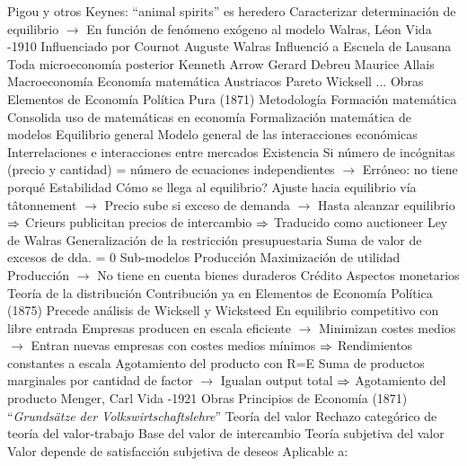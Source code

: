 \documentclass{nuevotema}
\begin{document}
\begin{esquemal}
				\4[] Pigou y otros
				\4[] Keynes: ``animal spirits'' es heredero
				\4[$\then$] Caracterizar determinación de equilibrio
				\4[] $\to$ En función de fenómeno exógeno al modelo
		\2 Walras, Léon
			\3 Vida
				-1910
			\3 Influenciado por
				\4 Cournot
				\4 Auguste Walras
			\3 Influenció a
				\4 Escuela de Lausana
				\4 Toda microeconomía posterior
				\4[] Kenneth Arrow
				\4[] Gerard Debreu
				\4[] Maurice Allais
				\4 Macroeconomía
				\4 Economía matemática
				\4 Austriacos
				\4 Pareto
				\4 Wicksell
				\4 ...
			\3 Obras
				\4 Elementos de Economía Política Pura (1871)
			\3 Metodología
				\4 Formación matemática
				\4 Consolida uso de matemáticas en economía
				\4 Formalización matemática de modelos
			\3 Equilibrio general
				\4 Modelo general de las interacciones económicas
				\4[] Interrelaciones e interacciones entre mercados
				\4 Existencia
				\4[] Si número de incógnitas (precio y cantidad)
				\4[] = número de ecuaciones independientes
				\4[] $\to$ Erróneo: no tiene porqué
				\4 Estabilidad
				\4[] Cómo se llega al equilibrio?
				\4[] Ajuste hacia equilibrio vía tâtonnement
				\4[] $\to$ Precio sube si exceso de demanda
				\4[] $\to$ Hasta alcanzar equilibrio
				\4[] $\then$ Crieurs publicitan precios de intercambio
				\4[] $\then$ Traducido como auctioneer
				\4 Ley de Walras
				\4[] Generalización de la restricción presupuestaria
				\4[] Suma de valor de excesos de dda. = 0
				\4 Sub-modelos
				\4[] Producción
				\4[] Maximización de utilidad
				\4[] Producción
				\4[] $\to$ No tiene en cuenta bienes duraderos
				\4[] Crédito
				\4[] Aspectos monetarios
			\3 Teoría de la distribución
				\4 Contribución ya en Elementos de Economía Política  (1875)
				\4 Precede análisis de Wicksell y Wicksteed
				\4 En equilibrio competitivo con libre entrada
				\4[] Empresas producen en escala eficiente
				\4[] $\to$ Minimizan costes medios
				\4[] $\to$ Entran nuevas empresas con costes medios mínimos
				\4[] $\then$ Rendimientos constantes a escala
				\4 Agotamiento del producto con R=E
				\4[] Suma de productos marginales por cantidad de factor
				\4[] $\to$ Igualan output total
				\4[] $\then$ Agotamiento del producto
		\2 Menger, Carl
			\3 Vida
				-1921
			\3 Obras
				\4 Principios de Economía (1871)
				\4 ``\textit{Grundsätze der Volkswirtschaftslehre}''
			\3 Teoría del valor
				\4 Rechazo categórico de teoría del valor-trabajo
				\4[] Base del valor de intercambio
				\4 Teoría subjetiva del valor
				\4[] Valor depende de satisfacción subjetiva de deseos
				\4[] Aplicable a:

\end{esquemal}
\end{document}
